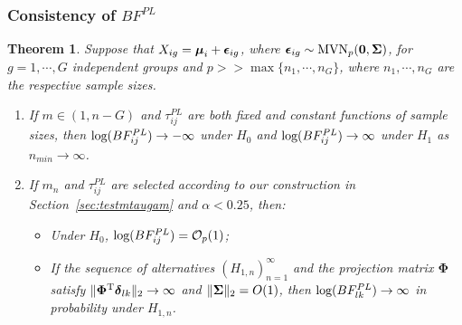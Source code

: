 \documentclass[times,sort&compress,3p]{elsarticle}
\theoremstyle{plain}%
\newtheorem{theorem}{Theorem}
\theoremstyle{definition}
\def\bzero{{\mathbf 0}}
\def\log{\hbox{log}}
\def\MVN{\hbox{MVN}}
\def\log{\hbox{log}}
\def\trans{^{\rm T}}
\def\bzero{{\mathbf 0}}
\newcommand{\bSigma}{\mbox{\boldmath $\Sigma$}}
\newcommand{\udelta}            {\mbox{\boldmath$\delta$}}
\newcommand{\uepsilon}          {\mbox{\boldmath$\epsilon$}}
\newcommand{\umu}               {\mbox{\boldmath$\mu$}}
\newcommand{\uSigma}            {\mbox{\boldmath$\Sigma$}}
\newcommand{\rsz}[1]{\textcolor{red}{#1}}
\begin{document}
\subsubsection{Consistency of $BF_{}^{PL}$}
\begin{theorem}\label{Thrm1}
Suppose that $X_{ig} = \umu_i + \uepsilon_{ig}$, where $\uepsilon_{ig} \sim \MVN_{p}(\bzero, \uSigma)$, for $g = 1, \cdots, G$ independent groups and $p >> \max\{n_1, \cdots, n_{G}\}$, where $n_1, \cdots, n_{G}$ are the respective sample sizes. %
\begin{enumerate}
    \item If $m \in (1, n - G)$ and $\tau^{PL}_{ij}$ are both fixed and constant functions of sample sizes, 
    then $\log(BF^{PL}_{ij}) \rightarrow -\infty$ under $H_0$ and $\log(BF^{PL}_{ij}) \rightarrow \infty$ under $H_1$ as $n_{min} \rightarrow \infty$. 
    \item If 
    $m_n$
    and $\tau^{PL}_{ij}$ are selected according to our construction in Section~\ref{sec:testmtaugam} 
    and $\alpha < 0.25$, then:
    \begin{itemize}
        \item[(a)] Under $H_0$, $\log(BF^{PL}_{ij}) = \mathcal{O}_{p}(1)$;
        \item[(b)] 
        If the sequence of alternatives $(H_{1,n})_{n = 1}^\infty$ and the projection matrix $\mathbf{\Phi}$ satisfy $\|\mathbf{\Phi}\trans\udelta_{lk}\|_2\to\infty$ and $\|\bSigma\|_2 = O(1)$, then $\log(BF^{PL}_{lk}) \rightarrow \infty$ in probability under $H_{1,n}$. 
    \end{itemize} 
\end{enumerate}
\end{theorem}
\end{document}

